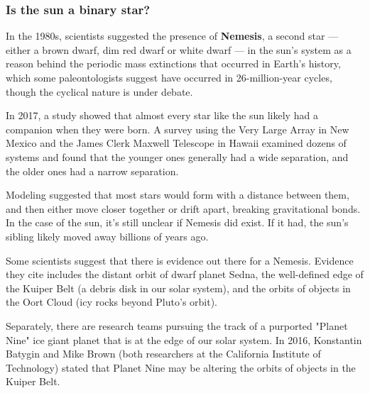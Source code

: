 \documentclass{article}
\begin{document}
\subsubsection{Is the sun a binary star?}
In the 1980s, scientists suggested the presence of \textbf{Nemesis}, a second star — either a brown dwarf, dim red dwarf or white dwarf — in the sun's system as a reason behind the periodic mass extinctions that occurred in Earth's history, which some paleontologists suggest have occurred in 26-million-year cycles, though the cyclical nature is under debate.
\\ \par
In 2017, a study showed that almost every star like the sun likely had a companion when they were born. A survey using the Very Large Array in New Mexico and the James Clerk Maxwell Telescope in Hawaii examined dozens of systems and found that the younger ones generally had a wide separation, and the older ones had a narrow separation. 
\\ \par
Modeling suggested that most stars would form with a distance between them, and then either move closer together or drift apart, breaking gravitational bonds. In the case of the sun, it's still unclear if Nemesis did exist. If it had, the sun's sibling likely moved away billions of years ago.
\\ \par
Some scientists suggest that there is evidence out there for a Nemesis. Evidence they cite includes the distant orbit of dwarf planet Sedna, the well-defined edge of the Kuiper Belt (a debris disk in our solar system), and the orbits of objects in the Oort Cloud (icy rocks beyond Pluto's orbit). 
\\ \par
Separately, there are research teams pursuing the track of a purported "Planet Nine" ice giant planet that is at the edge of our solar system. In 2016, Konstantin Batygin and Mike Brown (both researchers at the California Institute of Technology) stated that Planet Nine may be altering the orbits of objects in the Kuiper Belt.
\end{document}
